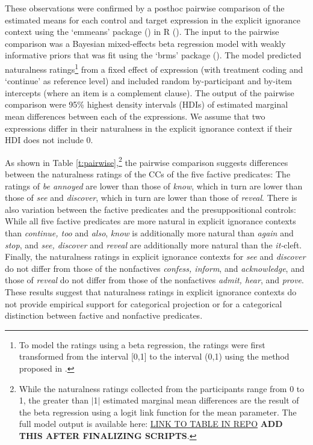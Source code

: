 \documentclass[11pt,fleqn]{article}
\newcommand{\6}{\mbox{$[\hspace*{-.6mm}[$}}
\newcommand{\9}{\mbox{$]\hspace*{-.6mm}]$}}
\begin{document}
These observations were confirmed by a posthoc pairwise comparison of the estimated means for each control and target expression in the explicit ignorance context using the `emmeans' package (\citealt{emmeans}) in R (\citealt{r}). The input to the pairwise comparison was a Bayesian mixed-effects beta regression model with weakly informative priors that was fit using the `brms' package (\citealt{buerkner2017}). The model predicted naturalness ratings\footnote{To model the ratings using a beta regression, the ratings were first transformed from the interval [0,1] to the interval (0,1) using the method proposed in \citealt{smithson-verkuilen2006}.} from a fixed effect of expression (with treatment coding and `continue' as reference level) and included random by-participant and by-item intercepts (where an item is a complement clause). The output of the pairwise comparison were 95\% highest density intervals (HDIs) of estimated marginal mean differences between each of the expressions. We assume that two expressions differ in their naturalness in the explicit ignorance context if their HDI does not include 0.

As shown in Table \ref{t:pairwise},\footnote{While the naturalness ratings collected from the participants range from 0 to 1, the greater than $|$1$|$  estimated marginal mean differences are the result of the beta regression using a logit link function for the mean parameter. The full model output is available here: \url{LINK TO TABLE IN REPO} {\bf ADD THIS AFTER FINALIZING SCRIPTS}.} the pairwise comparison suggests differences between the naturalness ratings of the CCs of the five factive predicates: The ratings of {\em be annoyed} are lower than those of {\em know}, which in turn are lower than those of {\em see} and {\em discover}, which in turn are lower than those of {\em reveal}. There is also variation between the factive predicates and the presuppositional controls: While all five factive predicates are more natural in explicit ignorance contexts than {\em continue, too} and {\em also}, {\em know} is additionally more natural than {\em again} and {\em stop}, and {\em see, discover} and {\em reveal} are additionally more natural than the {\em it-}cleft. Finally, the naturalness ratings in explicit ignorance contexts for {\em see} and {\em discover} do not differ from those of the nonfactives {\em confess, inform}, and {\em acknowledge}, and those of {\em reveal} do not differ from those of the nonfactives {\em admit, hear}, and {\em prove}. These results suggest that naturalness ratings in explicit ignorance contexts do not provide empirical support for categorical projection or for a categorical distinction between factive and nonfactive predicates. 
\end{document}
